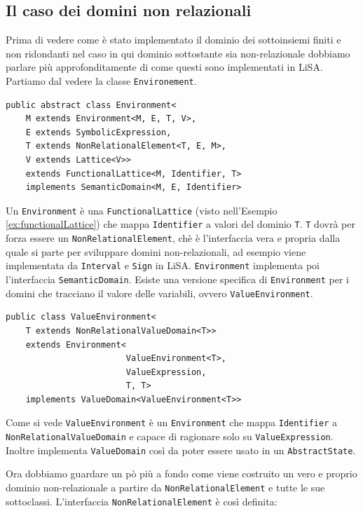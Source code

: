 \subsection{Il caso dei domini non relazionali}

Prima di vedere come è stato implementato il dominio dei sottoinsiemi finiti e non ridondanti nel caso in qui dominio sottostante sia non-relazionale dobbiamo parlare più approfonditamente di come questi sono implementati in LiSA. Partiamo dal vedere la classe \texttt{Environement}. 

\begin{lstlisting}[belowskip=-1.1 \baselineskip]
public abstract class Environment<
    M extends Environment<M, E, T, V>,
    E extends SymbolicExpression,
    T extends NonRelationalElement<T, E, M>,
    V extends Lattice<V>>
    extends FunctionalLattice<M, Identifier, T> 
    implements SemanticDomain<M, E, Identifier>
\end{lstlisting}
Un \texttt{Environment} è una \texttt{FunctionalLattice} (visto nell'Esempio \ref{ex:functionalLattice}) che mappa \texttt{Identifier} a valori del dominio \texttt{T}. \texttt{T} dovrà per forza essere un \texttt{NonRelationalElement}, chè è l'interfaccia vera e propria dalla quale si parte per sviluppare domini non-relazionali, ad esempio viene implementata da \texttt{Interval} e \texttt{Sign} in LiSA. \texttt{Environment} implementa poi l'interfaccia \texttt{SemanticDomain}. Esiste una versione specifica di \texttt{Environment} per i domini che tracciano il valore delle variabili, ovvero \texttt{ValueEnvironment}.

\begin{lstlisting}[belowskip=-1.1 \baselineskip]
public class ValueEnvironment<
    T extends NonRelationalValueDomain<T>>
    extends Environment<
                        ValueEnvironment<T>, 
                        ValueExpression, 
                        T, T>
    implements ValueDomain<ValueEnvironment<T>> 
\end{lstlisting}
Come si vede \texttt{ValueEnvironment} è un \texttt{Environment} che mappa \texttt{Identifier} a \texttt{NonRelationalValueDomain} e capace di ragionare solo su \texttt{ValueExpression}. Inoltre implementa \texttt{ValueDomain} così da poter essere usato in un \texttt{AbstractState}.

Ora dobbiamo guardare un pò più a fondo come viene costruito un vero e proprio dominio non-relazionale a partire da \texttt{NonRelationalElement} e tutte le sue sottoclassi. L'interfaccia \texttt{NonRelationalElement} è così definita:

